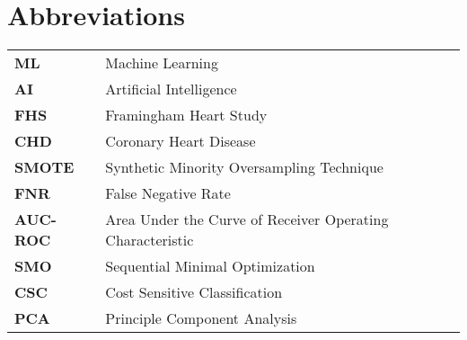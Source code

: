 \newpage
{}

\begin{abstract}


\end{abstract}
\newpage

\section*{Abbreviations}

\begin{tabular}{ll}
\textbf{ML}       & Machine Learning \\
\textbf{AI}       & Artificial Intelligence \\
\textbf{FHS}      & Framingham Heart Study \\
\textbf{CHD}      & Coronary Heart Disease \\
\textbf{SMOTE}    & Synthetic Minority Oversampling Technique \\
\textbf{FNR}      & False Negative Rate \\
\textbf{AUC-ROC}  & Area Under the Curve of Receiver Operating Characteristic \\
\textbf{SMO}      & Sequential Minimal Optimization \\
\textbf{CSC}      & Cost Sensitive Classification \\
\textbf{PCA}      & Principle Component Analysis \\
\end{tabular}


\listoffigures 
{}
\listoftables

\newpage

\tableofcontents

\newpage
{}